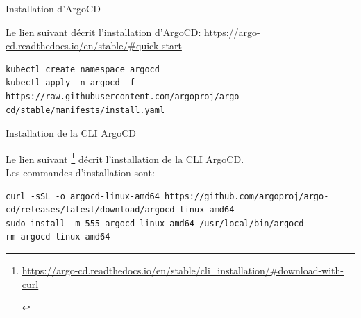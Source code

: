 
\begin{frame}[fragile]{Installation d'ArgoCD}

Le lien suivant décrit l'installation d'ArgoCD: \url{https://argo-cd.readthedocs.io/en/stable/#quick-start}

\begin{tiny}
\begin{Verbatim}[commandchars=\&\#\#]
kubectl create namespace argocd
kubectl apply -n argocd -f https://raw.githubusercontent.com/argoproj/argo-cd/stable/manifests/install.yaml
\end{Verbatim}
\end{tiny}

\end{frame}


\begin{frame}[fragile]{Installation de la CLI ArgoCD}

   Le lien suivant \footnote{
      \begin{tcolorbox}
 \url{https://argo-cd.readthedocs.io/en/stable/cli_installation/\#download-with-curl}
      \end{tcolorbox}
   }
   décrit l'installation de la CLI ArgoCD.\\
   Les commandes d'installation sont:\\

\begin{tiny}
\begin{Verbatim}[commandchars=\&\#\#]
curl -sSL -o argocd-linux-amd64 https://github.com/argoproj/argo-cd/releases/latest/download/argocd-linux-amd64
sudo install -m 555 argocd-linux-amd64 /usr/local/bin/argocd
rm argocd-linux-amd64
\end{Verbatim}
\end{tiny}


\end{frame}


